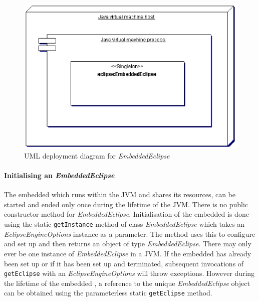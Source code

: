 \begin{center}
  \begin{figure}[htb]
    \begin{center}
        \includegraphics{embjava-diagrams/embedded-deployment.eps}
    \end{center}
    \caption{\label{fig:ji-embedded-deployment}UML deployment diagram for {\it EmbeddedEclipse}}
  \end{figure}
\end{center}



\paragraph{Initialising an {\it EmbeddedEclipse}}

The embedded {\eclipse} which runs within the JVM and shares its
resources, can be started and ended only once during the lifetime of
the JVM. There is no public constructor method for {\it
EmbeddedEclipse}. Initialisation of the embedded {\eclipse} is done
using the static {\tt getInstance} method of class {\it
EmbeddedEclipse} which takes an {\it EclipseEngineOptions} instance as
a parameter. The method uses this to configure and set up {\eclipse}
and then returns an object of type {\it EmbeddedEclipse}. There may
only ever be one instance of {\it EmbeddedEclipse} in a JVM. If the
embedded {\eclipse} has already been set up or if it has been set up
and terminated, subsequent invocations of {\tt getEclipse} with an
{\it EclipseEngineOptions} will throw exceptions. However during the
lifetime of the embedded {\eclipse}, a reference to the unique {\it
EmbeddedEclipse} object can be obtained using the parameterless static
{\tt getEclipse} method.

